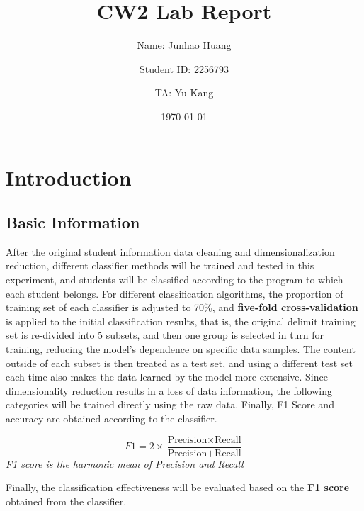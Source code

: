 \documentclass[twocolumn]{IEEEtran}
\title{CW2 Lab Report}
\author{Name: Junhao Huang \and Student ID: 2256793 \and TA: Yu Kang}
\date{\today}
\begin{document}

\maketitle

\section{Introduction}
\subsection{Basic Information}
After the original student information data cleaning and dimensionalization reduction, different classifier methods will be trained and tested in this experiment, and students will be classified according to the program to which each student belongs. For different classification algorithms, the proportion of training set of each classifier is adjusted to 70\%, and \textbf{five-fold cross-validation} is applied to the initial classification results, that is, the original delimit training set is re-divided into 5 subsets, and then one group is selected in turn for training, reducing the model's dependence on specific data samples. The content outside of each subset is then treated as a test set, and using a different test set each time also makes the data learned by the model more extensive. Since dimensionality reduction results in a loss of data information, the following categories will be trained directly using the raw data. Finally, F1 Score and accuracy are obtained according to the classifier.

\begin{equation}
    F1 = 2 \times \frac{\text{Precision} \times \text{Recall}}{\text{Precision} + \text{Recall}}
\end{equation}
\textit{F1 score is the harmonic mean of Precision and Recall}

Finally, the classification effectiveness will be evaluated based on the \textbf{F1 score} obtained from the classifier.

\end{document}
